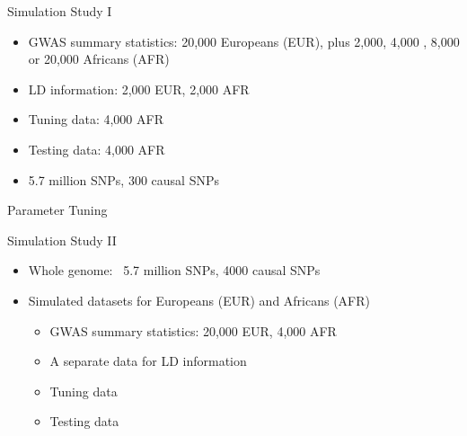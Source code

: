 \documentclass{beamer}
\begin{document}
\begin{frame}{Simulation Study I}
\begin{itemize}
    \item GWAS summary statistics: 20,000 Europeans (EUR), plus 2,000, 4,000 , 8,000 or 20,000 Africans (AFR)
    \item LD information: 2,000 EUR, 2,000 AFR 
    \item Tuning data: 4,000 AFR
    \item Testing data: 4,000 AFR
    \item 5.7 million SNPs, 300 causal SNPs
\end{itemize}
\end{frame}

\begin{frame}{Parameter Tuning}
\begin{figure}[h]	\noindent{}
      \label{fig:modeltuning_gamma_vs_AUC}
\end{figure}
\end{frame}


\begin{frame}{Simulation Study II}
\begin{itemize}
    \item Whole genome: ~5.7 million SNPs, 4000 causal SNPs
    \item Simulated datasets for Europeans (EUR) and Africans (AFR)
    \begin{itemize}
    \item GWAS summary statistics: 20,000 EUR, 4,000 AFR
    \item A separate data for LD information
    \item Tuning data
    \item Testing data
    \end{itemize}

\end{itemize}
\end{frame}
\end{document}
